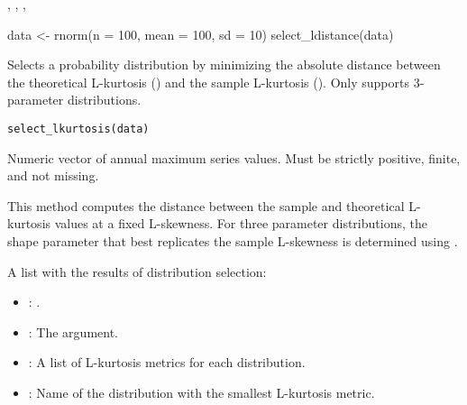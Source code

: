 \documentclass[a4paper]{book}
\begin{document}
%
\begin{SeeAlso}
, , ,
\end{SeeAlso}
%
\begin{Examples}
\begin{ExampleCode}
data <- rnorm(n = 100, mean = 100, sd = 10)
select_ldistance(data)

\end{ExampleCode}
\end{Examples}
%
\begin{Description}
Selects a probability distribution by minimizing the absolute distance
between the theoretical L-kurtosis () and the sample L-kurtosis
(). Only supports 3-parameter distributions.
\end{Description}
%
\begin{Usage}
\begin{verbatim}
select_lkurtosis(data)
\end{verbatim}
\end{Usage}
%
\begin{Arguments}
\begin{ldescription}
\item[\code{data}] Numeric vector of annual maximum series values.
Must be strictly positive, finite, and not missing.
\end{ldescription}
\end{Arguments}
%
\begin{Details}
This method computes the distance between the sample and theoretical L-kurtosis
values at a fixed L-skewness. For three parameter distributions, the shape parameter
that best replicates the sample L-skewness is determined using .
\end{Details}
%
\begin{Value}
A list with the results of distribution selection:
\begin{itemize}

\item{} : .
\item{} : The  argument.
\item{} : A list of L-kurtosis metrics for each distribution.
\item{} : Name of the distribution with the smallest L-kurtosis metric.

\end{itemize}

\end{Value}
\end{document}
